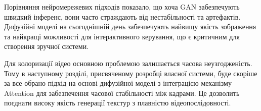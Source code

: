     Порівняння нейромережевих підходів показало, що хоча GAN забезпечують швидкий інференс, вони часто страждають від нестабільності та артефактів.
    Дифузійні моделі на сьогоднішній день забезпечують найвищу якість зображення та найкращі можливості для інтерактивного керування, що є критичним для створення зручної системи.
    
    Для колоризації відео основною проблемою залишається часова неузгодженість.
    Тому в наступному розділі, присвяченому розробці власної системи, буде скоріше за все обрано підхід на основі дифузійної моделі з інтеграцією механізму Attention для забезпечення часової стабільності між кадрами.
    Це дозволить поєднати високу якість генерації текстур з плавністю відеопослідовності.











